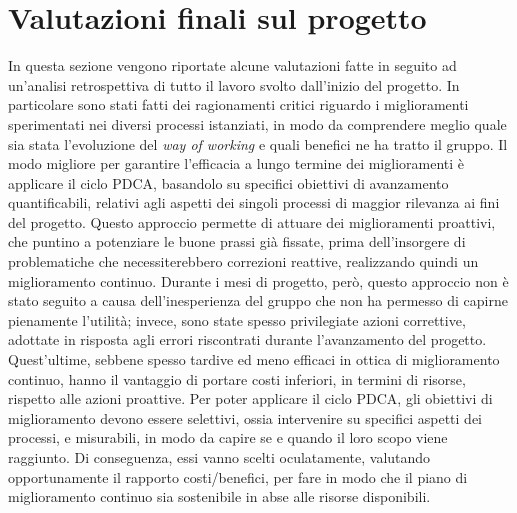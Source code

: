 
\section{Valutazioni finali sul progetto}
	In questa sezione vengono riportate alcune valutazioni fatte in seguito ad un'analisi retrospettiva di tutto il lavoro svolto dall'inizio del progetto. In particolare sono stati fatti dei ragionamenti critici riguardo i miglioramenti sperimentati nei diversi processi istanziati, in modo da comprendere meglio quale sia stata l'evoluzione del \textit{way of working} e quali benefici ne ha tratto il gruppo.
	\newline\newline
	Il modo migliore per garantire l'efficacia a lungo termine dei miglioramenti è applicare il ciclo PDCA, basandolo su specifici obiettivi di avanzamento quantificabili, relativi agli aspetti dei singoli processi di maggior rilevanza ai fini del progetto. Questo approccio permette di attuare dei miglioramenti proattivi, che puntino a potenziare le buone prassi già fissate, prima dell'insorgere di problematiche che necessiterebbero correzioni reattive, realizzando quindi un miglioramento continuo.
	\newline
	Durante i mesi di progetto, però, questo approccio non è stato seguito a causa dell'inesperienza del gruppo che non ha permesso di capirne pienamente l'utilità; invece, sono state spesso privilegiate azioni correttive, adottate in risposta agli errori riscontrati durante l'avanzamento del progetto. Quest'ultime, sebbene spesso tardive ed meno efficaci in ottica di miglioramento continuo, hanno il vantaggio di portare costi inferiori, in termini di risorse, rispetto alle azioni proattive.
	\newline
	Per poter applicare il ciclo PDCA, gli obiettivi di miglioramento devono essere selettivi, ossia intervenire su specifici aspetti dei processi, e misurabili, in modo da capire se e quando il loro scopo viene raggiunto. Di conseguenza, essi vanno scelti oculatamente, valutando opportunamente il rapporto costi/benefici, per fare in modo che il piano di miglioramento continuo sia sostenibile in abse alle risorse disponibili.
